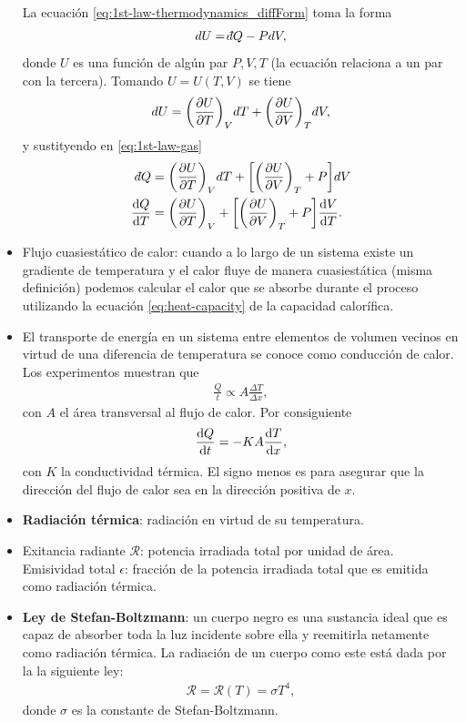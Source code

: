 \begin{itemize}
La ecuación \eqref{eq:1st-law-thermodynamics_diffForm} toma 
la forma 
\begin{align}
   dU =\dbar Q-PdV,
   \label{eq:1st-law-gas}
 \end{align} 
donde $U$ es una función de algún par $P,V,T$ (la ecuación relaciona 
a un par con la tercera). Tomando $U=U(T,V)$ se tiene 
\begin{align*}
dU=\qty(\pdv{U}{T	})_VdT+\qty(\pdv{U}{V})_TdV,
\end{align*}
y sustityendo en \eqref{eq:1st-law-gas}
\begin{align*}
\dbar Q &=\qty(\pdv{U}{T	})_VdT+\qty[\qty(\pdv{U}{V})_T+P]dV\\
\dv{Q}{T} &= \qty(\pdv{U}{T	})_V
+\qty[\qty(\pdv{U}{V})_T+P]\dv{V}{T}.
\end{align*}
\item Flujo cuasiestático de calor: cuando a lo largo de un sistema 
existe un gradiente de temperatura y el calor fluye de manera
cuasiestática (misma definición) podemos calcular el 
calor que se absorbe durante el proceso utilizando la ecuación 
\eqref{eq:heat-capacity} de la capacidad calorífica.
\item El transporte de energía en un sistema entre elementos
de volumen vecinos en virtud de una diferencia de temperatura se 
conoce como conducción de calor. Los experimentos muestran que 
\begin{align*}
\frac{Q}{t}\propto A\frac{\Delta T}{\Delta x},
\end{align*}
con $A$ el área transversal al flujo de calor. Por consiguiente
\begin{align}
\dv{Q}{t	} = -KA\dv{T}{x},
\end{align}
con $K$ la conductividad térmica. El signo menos es para asegurar
que la dirección del flujo de calor sea en la dirección positiva de $x$.
\item \textbf{Radiación térmica}: radiación en virtud de su temperatura.
\item Exitancia radiante $\mathcal{R}$: potencia irradiada total por 
unidad de área. Emisividad total $\epsilon$: fracción de la potencia
irradiada total que es emitida como radiación térmica.
\item \textbf{Ley de Stefan-Boltzmann}: un cuerpo negro es una
sustancia ideal que es capaz de absorber toda la luz incidente 
sobre ella y reemitirla netamente como radiación térmica. La
radiación de un cuerpo como este está dada por la la siguiente ley:
\begin{align}
  \mathcal{R}=\mathcal{R}(T)=\sigma T^4,
  \label{eq:stefan-boltzmann}
\end{align}
donde $\sigma$ es la constante de Stefan-Boltzmann.
\end{itemize}

